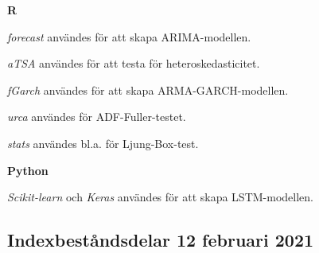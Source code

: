 \documentclass[11pt]{article}
\numberwithin{equation}{section}
\numberwithin{table}{section}
\numberwithin{figure}{section}
\begin{document}
\textbf{R} \par
\textit{forecast} användes för att skapa ARIMA-modellen. \par
\textit{aTSA} användes för att testa för heteroskedasticitet. \par
\textit{fGarch} användes för att skapa ARMA-GARCH-modellen. \par
\textit{urca} användes för ADF-Fuller-testet. \par
\textit{stats} användes bl.a. för Ljung-Box-test. \par

\textbf{Python} \par
\textit{Scikit-learn} och \textit{Keras} användes för att skapa LSTM-modellen.

\subsection{Indexbeståndsdelar 12 februari 2021}
\end{document}
